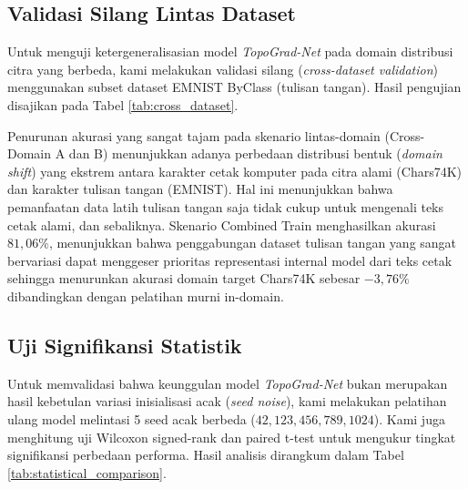 \documentclass[journal]{IEEEtran}
\begin{document}
\subsection{Validasi Silang Lintas Dataset}
Untuk menguji ketergeneralisasian model \textit{TopoGrad-Net} pada domain distribusi citra yang berbeda, kami melakukan validasi silang (\textit{cross-dataset validation}) menggunakan subset dataset EMNIST ByClass (tulisan tangan). Hasil pengujian disajikan pada Tabel \ref{tab:cross_dataset}.

\begin{table}[htbp]
\caption{Hasil Validasi Silang Dataset Chars74K dan EMNIST}
\label{tab:cross_dataset}
\begin{center}
\footnotesize
{}
\end{center}
\end{table}

Penurunan akurasi yang sangat tajam pada skenario lintas-domain (Cross-Domain A dan B) menunjukkan adanya perbedaan distribusi bentuk (\textit{domain shift}) yang ekstrem antara karakter cetak komputer pada citra alami (Chars74K) dan karakter tulisan tangan (EMNIST). Hal ini menunjukkan bahwa pemanfaatan data latih tulisan tangan saja tidak cukup untuk mengenali teks cetak alami, dan sebaliknya. Skenario Combined Train menghasilkan akurasi $81{,}06\%$, menunjukkan bahwa penggabungan dataset tulisan tangan yang sangat bervariasi dapat menggeser prioritas representasi internal model dari teks cetak sehingga menurunkan akurasi domain target Chars74K sebesar $-3{,}76\%$ dibandingkan dengan pelatihan murni in-domain.

\subsection{Uji Signifikansi Statistik}
Untuk memvalidasi bahwa keunggulan model \textit{TopoGrad-Net} bukan merupakan hasil kebetulan variasi inisialisasi acak (\textit{seed noise}), kami melakukan pelatihan ulang model melintasi 5 seed acak berbeda ($42, 123, 456, 789, 1024$). Kami juga menghitung uji Wilcoxon signed-rank dan paired t-test untuk mengukur tingkat signifikansi perbedaan performa. Hasil analisis dirangkum dalam Tabel \ref{tab:statistical_comparison}.
\end{document}
